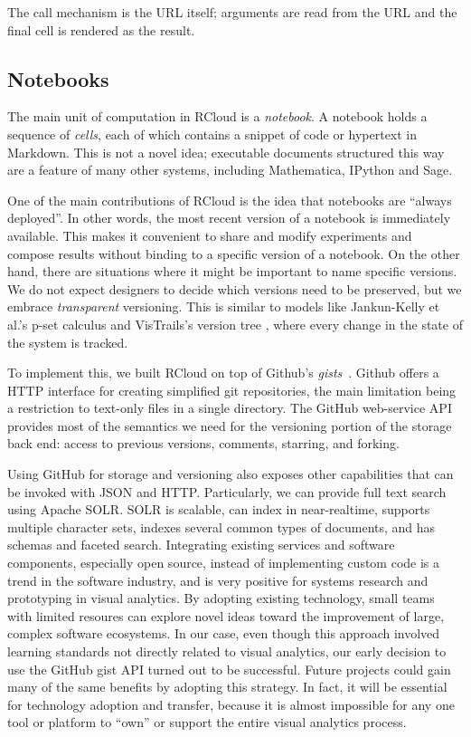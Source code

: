The call mechanism is the URL itself; arguments are read from the URL
and the final cell is rendered as the result.  

\subsection{Notebooks\label{sec:notebooks}}

The main unit of computation in RCloud is a \emph{notebook}.
A notebook holds a sequence of \emph{cells}, each of which contains a
snippet of code or hypertext in Markdown. This is not a novel idea;
executable documents structured this way are a feature of many
other systems, including Mathematica, IPython and Sage.

One of the main contributions of RCloud is the idea that notebooks
are ``always deployed''. In other words, the most recent version of
a notebook is immediately available.
This makes it convenient to share and modify experiments and compose
results without binding to a specific version of a notebook.
On the other hand, there are situations where it might be important
to name specific versions. We do not expect designers to decide which
versions need to be preserved, but we embrace \emph{transparent} versioning.
This is similar to models like Jankun-Kelly et al.'s p-set calculus \cite{Jankun-Kelly:2007:MFV}
and VisTrails's version tree \cite{Callahan:2006:VVM}, where every change in the state of the system is tracked.

To implement this, we built RCloud on top of Github's \emph{gists}~\cite{Github:2014:GG}.
Github offers a HTTP interface for creating simplified git repositories, the main limitation
being a restriction to text-only files in a single directory. The GitHub web-service
API provides most of the semantics we need for the versioning portion of the storage back end:
access to previous versions, comments, starring, and forking.

Using GitHub for storage and versioning also exposes other capabilities
that can be invoked with JSON and HTTP.
Particularly, we can provide full text search using Apache SOLR.
SOLR is scalable, can index in near-realtime, supports multiple character sets,
indexes several common types of documents, and has schemas and faceted search.
%
Integrating existing services and software components, especially open source,
instead of implementing custom code is a trend in the software industry, and
is very positive for systems research and prototyping in visual analytics.
By adopting existing technology, small teams with limited resoures can explore
novel ideas toward the improvement of large, complex software ecosystems.
In our case, even though this approach involved learning standards not directly
related to visual analytics, our early decision to use the GitHub gist API
turned out to be successful. Future projects could gain many of the same benefits
by adopting this strategy. In fact, it will be essential for technology adoption
and transfer, because it is almost impossible for any one tool or platform to
``own'' or support the entire visual analytics process.

